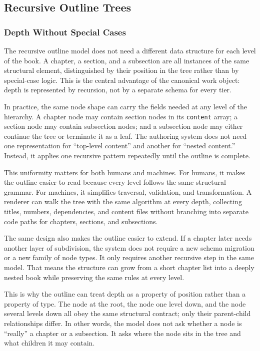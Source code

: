 \documentclass[11pt]{article}
\begin{document}

\subsection{Recursive Outline Trees}

\subsubsection{Depth Without Special Cases}


The recursive outline model does not need a different data structure for each level of the book. A chapter, a section, and a subsection are all instances of the same structural element, distinguished by their position in the tree rather than by special-case logic. This is the central advantage of the canonical work object: depth is represented by recursion, not by a separate schema for every tier.

In practice, the same node shape can carry the fields needed at any level of the hierarchy. A chapter node may contain section nodes in its \texttt{content} array; a section node may contain subsection nodes; and a subsection node may either continue the tree or terminate it as a leaf. The authoring system does not need one representation for ``top-level content'' and another for ``nested content.'' Instead, it applies one recursive pattern repeatedly until the outline is complete.

This uniformity matters for both humans and machines. For humans, it makes the outline easier to read because every level follows the same structural grammar. For machines, it simplifies traversal, validation, and transformation. A renderer can walk the tree with the same algorithm at every depth, collecting titles, numbers, dependencies, and content files without branching into separate code paths for chapters, sections, and subsections.

The same design also makes the outline easier to extend. If a chapter later needs another layer of subdivision, the system does not require a new schema migration or a new family of node types. It only requires another recursive step in the same model. That means the structure can grow from a short chapter list into a deeply nested book while preserving the same rules at every level.

This is why the outline can treat depth as a property of position rather than a property of type. The node at the root, the node one level down, and the node several levels down all obey the same structural contract; only their parent-child relationships differ. In other words, the model does not ask whether a node is ``really'' a chapter or a subsection. It asks where the node sits in the tree and what children it may contain.
\end{document}
